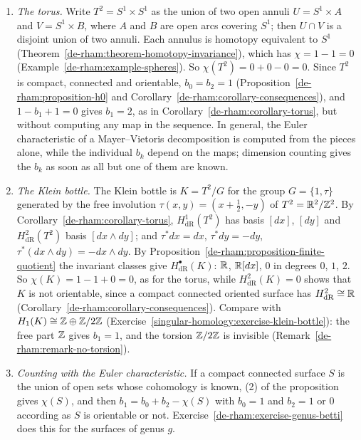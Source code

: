 \begin{example}\label{de-rham:example-dimension-counting}
\begin{enumerate}
\item \emph{The torus.} Write $T^2 = S^1 \times S^1$ as the union of two open annuli $U = S^1 \times A$ and $V = S^1 \times B$, where $A$ and $B$ are open arcs covering $S^1$; then $U \cap V$ is a disjoint union of two annuli. Each annulus is
homotopy equivalent to $S^1$ (Theorem~\ref{de-rham:theorem-homotopy-invariance}), which has $\chi = 1 - 1 = 0$ (Example~\ref{de-rham:example-spheres}). So $\chi(T^2) = 0 + 0 - 0 = 0$. Since $T^2$ is compact, connected and orientable, $b_0 = b_2 = 1$ (Proposition~\ref{de-rham:proposition-h0} and
Corollary~\ref{de-rham:corollary-consequences}), and $1 - b_1 + 1 = 0$ gives $b_1 = 2$, as in Corollary~\ref{de-rham:corollary-torus}, but without computing any map in the sequence. In general, the
Euler characteristic of a Mayer--Vietoris decomposition is computed from the pieces alone, while the individual $b_k$ depend on the maps; dimension counting gives the $b_k$ as soon as all but one of them are known.
\item \emph{The Klein bottle.} The Klein bottle is $K = T^2/G$ for the group $G = \{1, \tau\}$ generated by the free involution $\tau(x, y) = (x + \frac12, -y)$ of $T^2 = \mathbb{R}^2/\mathbb{Z}^2$. By Corollary~\ref{de-rham:corollary-torus},
$H^1_{\mathrm{dR}}(T^2)$ has basis $[dx]$, $[dy]$ and $H^2_{\mathrm{dR}}(T^2)$ basis $[dx \wedge dy]$; and $\tau^*dx = dx$, $\tau^*dy = -dy$, $\tau^*(dx \wedge dy) = -dx \wedge dy$. By
Proposition~\ref{de-rham:proposition-finite-quotient} the invariant classes give $H^\bullet_{\mathrm{dR}}(K)$: $\mathbb{R}$, $\mathbb{R}[dx]$, $0$ in degrees $0$, $1$, $2$. So $\chi(K) = 1 - 1 + 0 = 0$, as for the torus, while
$H^2_{\mathrm{dR}}(K) = 0$ shows that $K$ is not orientable, since a compact connected oriented surface has $H^2_{\mathrm{dR}} \cong \mathbb{R}$ (Corollary~\ref{de-rham:corollary-consequences}). Compare with
$H_1(K) \cong \mathbb{Z} \oplus \mathbb{Z}/2\mathbb{Z}$ (Exercise~\ref{singular-homology:exercise-klein-bottle}): the free part $\mathbb{Z}$ gives $b_1 = 1$, and the torsion $\mathbb{Z}/2\mathbb{Z}$ is invisible (Remark~\ref{de-rham:remark-no-torsion}).
\item \emph{Counting with the Euler characteristic.} If a compact connected surface $S$ is the union of open sets whose cohomology is known, (2) of the proposition gives $\chi(S)$, and then
$b_1 = b_0 + b_2 - \chi(S)$ with $b_0 = 1$ and $b_2 = 1$ or $0$ according as $S$ is orientable or not. Exercise~\ref{de-rham:exercise-genus-betti} does this for the surfaces of genus $g$.
\end{enumerate}
\end{example}


